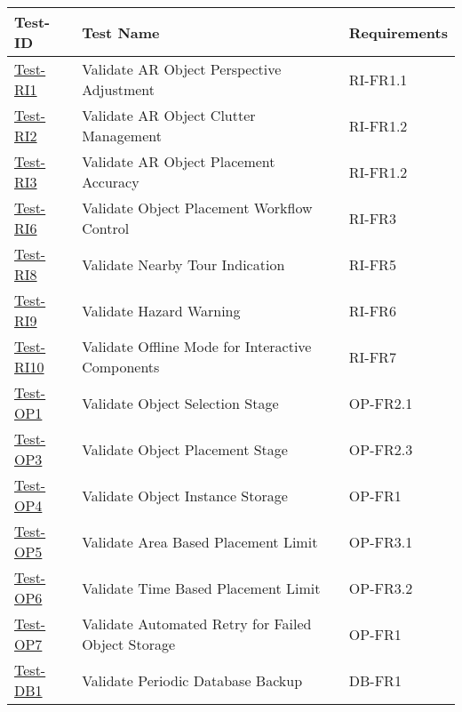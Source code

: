 \documentclass[12pt, titlepage]{article}
\begin{document}
\begin{table}[htpb!]
  \centering
  \begin{tabular}{|l|p{8cm}|p{3cm}|}
    \hline
    \textbf{Test-ID}                      & \textbf{Test Name}                                 & \textbf{Requirements} \\
    \hline
    \hyperref[itm:Test-RI1]{Test-RI1}     & Validate AR Object Perspective Adjustment          & RI-FR1.1              \\
    \hline
    \hyperref[itm:Test-RI2]{Test-RI2}     & Validate AR Object Clutter Management              & RI-FR1.2              \\
    \hline
    \hyperref[itm:Test-RI3]{Test-RI3}     & Validate AR Object Placement Accuracy              & RI-FR1.2              \\
    \hline
    \hyperref[itm:Test-RI6]{Test-RI6}     & Validate Object Placement Workflow Control         & RI-FR3                \\
    \hline
    \hyperref[itm:Test-RI8]{Test-RI8}     & Validate Nearby Tour Indication                    & RI-FR5                \\
    \hline
    \hyperref[itm:Test-RI9]{Test-RI9}     & Validate Hazard Warning                            & RI-FR6                \\
    \hline
    \hyperref[itm:Test-RI10]{Test-RI10}   & Validate Offline Mode for Interactive Components   & RI-FR7                \\
    \hline
    \hyperref[itm:Test-OP1]{Test-OP1}     & Validate Object Selection Stage                    & OP-FR2.1              \\
    \hline
    \hyperref[itm:Test-OP3]{Test-OP3}     & Validate Object Placement Stage                    & OP-FR2.3              \\
    \hline
    \hyperref[itm:Test-OP4]{Test-OP4}     & Validate Object Instance Storage                   & OP-FR1                \\
    \hline
    \hyperref[itm:Test-OP5]{Test-OP5}     & Validate Area Based Placement Limit                & OP-FR3.1              \\
    \hline
    \hyperref[itm:Test-OP6]{Test-OP6}     & Validate Time Based Placement Limit                & OP-FR3.2              \\
    \hline
    \hyperref[itm:Test-OP7]{Test-OP7}     & Validate Automated Retry for Failed Object Storage & OP-FR1                \\
    \hline
    \hyperref[itm:Test-DB1]{Test-DB1}     & Validate Periodic Database Backup                  & DB-FR1                \\

\end{tabular}
\end{table}
\end{document}
